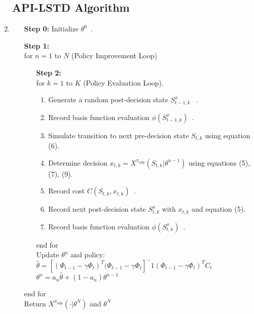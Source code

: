 \documentclass[12pt]{article} %
\begin{document}
\begin{enumerate}
    \subsection*{API-LSTD Algorithm}
    \hline
    \hline
    \item \begin{center}
        \begin{enumerate}
            \item[\textbf{Step 0:}] Initialize $\theta^0$\ .
            \item[\textbf{Step 1:}]\ \\
                for $n = 1$ to $N$ (Policy Improvement Loop)\\
                \begin{enumerate}
                    \item[\textbf{Step 2:}]\ \\for $k=1$ to $K$ (Policy Evaluation Loop).
                \begin{enumerate}
                    \item Generate a random post-decision state $S_{t-1,k}^x$ \ .
                    \item Record basis function evaluation $\phi(S_{t-1,k}^x)$\ .
                    \item Simulate transition to next pre-decision state $S_{t,k}$ using equation (6).
                    \item Determine decision $x_{t, k} = X^{\pi_{adp}}(S_{t,k} | \theta^{n-1})$ using equations (5), (7), (9).
                    \item Record cost $C(S_{t,k}, x_{t,k})$\ .
                    \item Record next post-decision state $S_{t,k}^x$ with $x_{t,k}$ and equation (5).
                    \item Record basis function evaluation $\phi(S_{t,k}^x)$\ .
                \end{enumerate}
                end for\\
                Update $\theta^n$ and policy:
            \\$\hat{\theta} = [(\Phi_{t-1}-\gamma\Phi_{t})^T(\Phi_{t-1}-\gamma\Phi_{t}]^-1(\Phi_{t-1}-\gamma\Phi_{t})^TC_t$\\$\theta^n=a_n\hat{\theta}+(1-a_n)\theta^{n-1}$
                \end{enumerate}
            end for\\
            Return $X^{\pi_{adp}}(\cdot|\theta^N)$ and $\theta^N$\\

\end{enumerate}
\end{center}
\end{enumerate}
\end{document}
